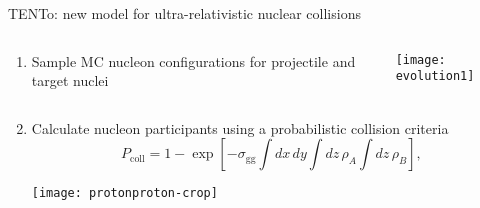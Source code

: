 \documentclass[svgnames]{beamer}
\newcommand{\trento}{T\raisebox{-.5ex}{R}ENTo}
\begin{document}
\begin{frame}{{\trento}: new model for ultra-relativistic nuclear collisions}
\vspace{0.1 in}
\begin{columns}
 \begin{column}{0.6\textwidth}
 \begin{enumerate}
  \item Sample MC nucleon configurations for projectile and target nuclei
 \end{enumerate}
 \end{column}
 \begin{column}{0.4\textwidth}
  \hspace{0.2 in} \vspace{-0.2 in} \texttt{[image: evolution1]}
 \end{column}
\end{columns}
\vspace{0.2 in}
\begin{enumerate}
\setcounter{enumi}{1}
\item Calculate nucleon participants using a probabilistic collision criteria
  \begin{equation}
  P_\text{coll} = 1 - \exp \left[ -\sigma_\text{gg} \int dx\, dy \int dz\, \rho_A \int dz\, \rho_B \right], \nonumber
  \end{equation}
  \begin{center}
    \texttt{[image: protonproton-crop]}
  \end{center}
\end{enumerate}

\end{frame}
\end{document}

